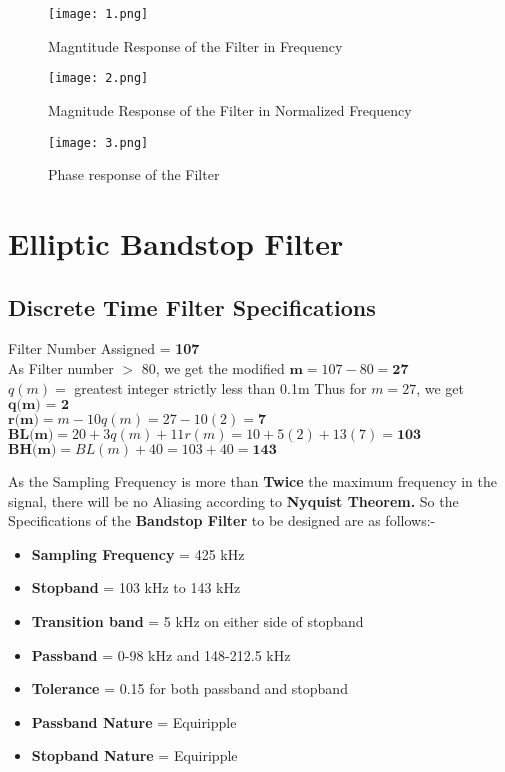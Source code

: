 \documentclass[12pt]{article}
\begin{document}
\begin{figure}[H]
    \centering
    \texttt{[image: 1.png]}
    \caption{Magntitude Response of the Filter in Frequency}
\end{figure}

\begin{figure}[H]
    \centering
    \texttt{[image: 2.png]}
    \caption{Magnitude Response of the Filter in Normalized Frequency}
\end{figure}

\begin{figure}[H]
    \centering
    \texttt{[image: 3.png]}
    \caption{Phase response of the Filter}
\end{figure}

\section{Elliptic Bandstop Filter}

\subsection{Discrete Time Filter Specifications}

Filter Number Assigned = \textbf{107}\\
As Filter number $>$ 80, we get the modified $\textbf{m} = 107 - 80 = \textbf{27}$\\
$q(m) =$ greatest integer strictly less than 0.1m
Thus for $m = 27$, we get $\textbf{q(m) = 2}$\\
$\textbf{r(m)} = m - 10q(m) = 27 - 10(2) = \textbf{7}$\\
$\textbf{BL(m)} = 20 + 3q(m) + 11r(m) = 10 + 5(2) + 13(7) = \textbf{103}$\\
$\textbf{BH(m)} = BL(m) + 40 = 103 + 40 = \textbf{143}$\\
\par

As the Sampling Frequency is more than \textbf{Twice} the maximum frequency in the signal, there will be no Aliasing according to \textbf{Nyquist Theorem.}
\noindent So the Specifications of the \textbf{Bandstop Filter} to be designed are as follows:-

\begin{itemize}
    \item \textbf{Sampling Frequency} = 425 kHz
    \item \textbf{Stopband} = 103 kHz to 143 kHz
    \item \textbf{Transition band} = 5 kHz on either side of stopband
    \item \textbf{Passband} = 0-98 kHz and 148-212.5 kHz
    \item \textbf{Tolerance} = 0.15 for both passband and stopband
    \item \textbf{Passband Nature} = Equiripple
    \item \textbf{Stopband Nature} = Equiripple
\end{itemize}
\end{document}
